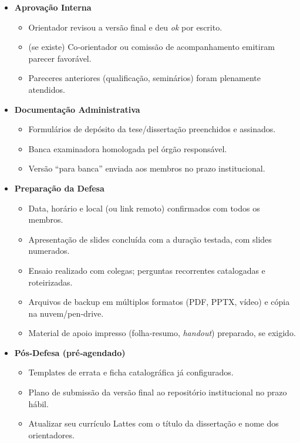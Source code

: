\begin{itemize}[label=\(\square\),leftmargin=*]
  \item \textbf{Aprovação Interna}
    \begin{itemize}[label=\(\square\),leftmargin=2em,nosep]
      \item Orientador revisou a versão final e deu \emph{ok} por escrito.
      \item (se existe) Co‑orientador ou comissão de acompanhamento emitiram parecer favorável.
      \item Pareceres anteriores (qualificação, seminários) foram plenamente atendidos.
    \end{itemize}

  \item \textbf{Documentação Administrativa}
    \begin{itemize}[label=\(\square\),leftmargin=2em,nosep]
      \item Formulários de depósito da tese/dissertação preenchidos e assinados.
      \item Banca examinadora homologada pel órgão responsável.
      \item Versão ``para banca'' enviada aos membros no prazo institucional.
    \end{itemize}

  \item \textbf{Preparação da Defesa}
    \begin{itemize}[label=\(\square\),leftmargin=2em,nosep]
      \item Data, horário e local (ou link remoto) confirmados com todos os membros.
    \item Apresentação de slides concluída com a duração testada, com slides numerados.
      \item Ensaio realizado com colegas; perguntas recorrentes catalogadas e roteirizadas.
      \item Arquivos de backup em múltiplos formatos (PDF, PPTX, vídeo) e cópia na nuvem/pen‑drive.
      \item Material de apoio impresso (folha‑resumo, \emph{handout}) preparado, se exigido.
    \end{itemize}

  \item \textbf{Pós‑Defesa (pré‑agendado)}
    \begin{itemize}[label=\(\square\),leftmargin=2em,nosep]
      \item Templates de errata e ficha catalográfica já configurados.
      \item Plano de submissão da versão final ao repositório institucional no prazo hábil.
      \item  Atualizar seu currículo Lattes com o título da dissertação e nome dos orientadores.
    \end{itemize}

\end{itemize}
